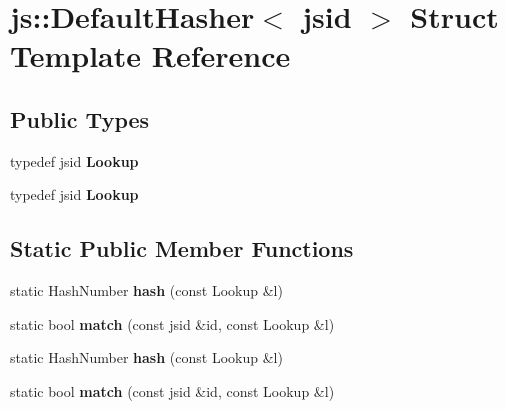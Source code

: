 \hypertarget{structjs_1_1_default_hasher_3_01jsid_01_4}{\section{js\-:\-:Default\-Hasher$<$ jsid $>$ Struct Template Reference}
\label{structjs_1_1_default_hasher_3_01jsid_01_4}
}
\subsection*{Public Types}
\begin{DoxyCompactItemize}
\item 
\hypertarget{structjs_1_1_default_hasher_3_01jsid_01_4_a815605d1508173d12d73f845bf00f34a}{typedef jsid {\bfseries Lookup}}\label{structjs_1_1_default_hasher_3_01jsid_01_4_a815605d1508173d12d73f845bf00f34a}

\item 
\hypertarget{structjs_1_1_default_hasher_3_01jsid_01_4_a815605d1508173d12d73f845bf00f34a}{typedef jsid {\bfseries Lookup}}\label{structjs_1_1_default_hasher_3_01jsid_01_4_a815605d1508173d12d73f845bf00f34a}

\end{DoxyCompactItemize}
\subsection*{Static Public Member Functions}
\begin{DoxyCompactItemize}
\item 
\hypertarget{structjs_1_1_default_hasher_3_01jsid_01_4_af6ef09b67713681c71ee829e6bc76de1}{static Hash\-Number {\bfseries hash} (const Lookup \&l)}\label{structjs_1_1_default_hasher_3_01jsid_01_4_af6ef09b67713681c71ee829e6bc76de1}

\item 
\hypertarget{structjs_1_1_default_hasher_3_01jsid_01_4_a2e01ffdd5a0edbd85a6a21bffea82f44}{static bool {\bfseries match} (const jsid \&id, const Lookup \&l)}\label{structjs_1_1_default_hasher_3_01jsid_01_4_a2e01ffdd5a0edbd85a6a21bffea82f44}

\item 
\hypertarget{structjs_1_1_default_hasher_3_01jsid_01_4_af6ef09b67713681c71ee829e6bc76de1}{static Hash\-Number {\bfseries hash} (const Lookup \&l)}\label{structjs_1_1_default_hasher_3_01jsid_01_4_af6ef09b67713681c71ee829e6bc76de1}

\item 
\hypertarget{structjs_1_1_default_hasher_3_01jsid_01_4_a2e01ffdd5a0edbd85a6a21bffea82f44}{static bool {\bfseries match} (const jsid \&id, const Lookup \&l)}\label{structjs_1_1_default_hasher_3_01jsid_01_4_a2e01ffdd5a0edbd85a6a21bffea82f44}

\end{DoxyCompactItemize}
